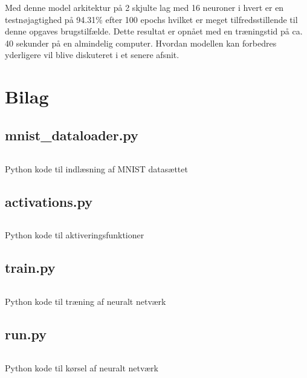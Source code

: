 \documentclass{article}
\newenvironment{code}{\captionsetup{type=listing}}{}
\begin{document}
Med denne model arkitektur på 2 skjulte lag med 16 neuroner i hvert er en testnøjagtighed på 94.31\% efter 100 epochs hvilket er meget tilfredsstillende til denne opgaves brugstilfælde. Dette resultat er opnået med en træningstid på ca. 40 sekunder på en almindelig computer. Hvordan modellen kan forbedres yderligere vil blive diskuteret i et senere afsnit.  
\newpage
\printbibliography

\newpage
\section{Bilag}
\subsection*{mnist\_dataloader.py}
\begin{code}
  \inputminted{python}{mnist_dataloader.py}
  \caption{Python kode til indlæsning af MNIST datasættet}
  \label{lst:mnist_dataloader}
\end{code}
\newpage

\subsection*{activations.py}
\begin{code}
  \inputminted{python}{activations.py}
  \caption{Python kode til aktiveringsfunktioner}
  \label{lst:activations}
\end{code}
\newpage

\subsection*{train.py}
\begin{code}
  \inputminted{python}{train.py}
  \caption{Python kode til træning af neuralt netværk}
  \label{lst:train}
\end{code}
\newpage

\subsection*{run.py}
\begin{code}
  \inputminted{python}{run.py}
  \caption{Python kode til kørsel af neuralt netværk}
  \label{lst:run}
\end{code}
\end{document}
